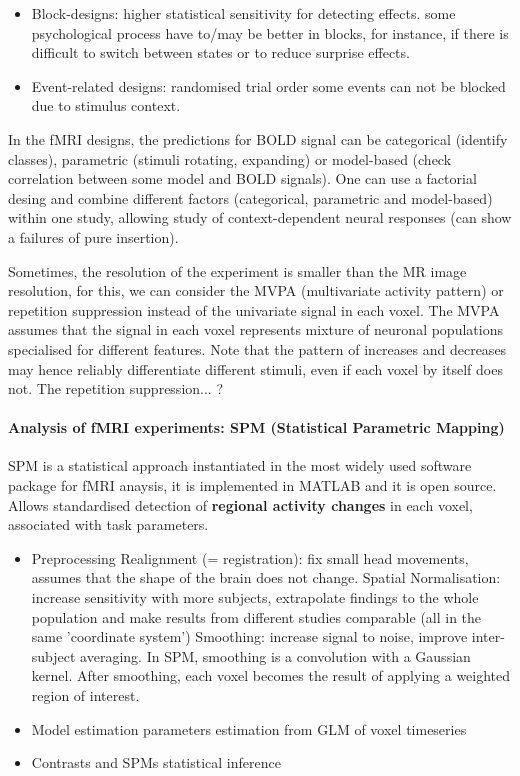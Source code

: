 \documentclass[12pt,article,oneside,a4paper]{memoir}
\begin{document}
\begin{itemize}
\item Block-designs:
\subitem higher statistical sensitivity for detecting effects.
\subitem some psychological process have to/may be better in blocks, for instance,
if there is difficult to switch between states or to reduce surprise effects.
\item Event-related designs:
\subitem randomised trial order
\subitem some events can not be blocked due to stimulus context.
\end{itemize}

In the fMRI designs, the predictions for BOLD signal can be categorical (identify
classes), parametric (stimuli rotating, expanding) or model-based (check correlation
between some model and BOLD signals). One can use a factorial desing and combine
different factors (categorical, parametric and model-based) within one study, allowing
study of context-dependent neural responses (can show a failures of pure insertion).

Sometimes, the resolution of the experiment is smaller than the MR image resolution,
for this, we can consider the MVPA (multivariate activity pattern) or repetition
suppression instead of the univariate signal in each voxel. The MVPA assumes that the
signal in each voxel represents mixture of neuronal populations specialised for
different features. Note that the pattern of increases and decreases may hence
reliably differentiate different stimuli, even if each voxel by itself does not.
The repetition suppression... ?

\paragraph{ Analysis of fMRI experiments: SPM (Statistical Parametric Mapping) } 
SPM is a statistical approach instantiated in the most widely used software package for
fMRI anaysis, it is implemented in MATLAB and it is open source. Allows standardised
detection of \textbf{regional activity changes} in each voxel, associated with task
parameters.

\begin{itemize}
\item Preprocessing
\subitem Realignment (= registration): fix small head movements, assumes that the shape
of the brain does not change.
\subitem Spatial Normalisation: increase sensitivity with more subjects, extrapolate
findings to the whole population and make results from different studies comparable (all
in the same 'coordinate system')
\subitem Smoothing: increase signal to noise, improve inter-subject averaging. In SPM,
smoothing is a convolution with a Gaussian kernel. After smoothing, each voxel becomes
the result of applying a weighted region of interest.
\item Model estimation
\subitem parameters estimation from GLM of voxel timeseries
\item Contrasts and SPMs
\subitem statistical inference
\end{itemize}
\end{document}
